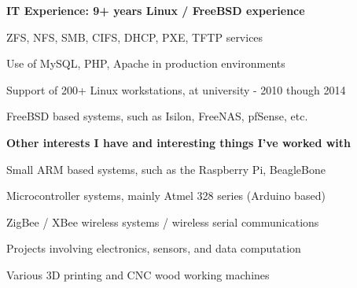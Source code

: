 \documentclass[10pt]{article}
\newcommand{\halfblankline}{\quad\vspace{-0.5\baselineskip}\pagebreak[3]}
\begin{document}
\begin{innerlist}
  \item[] \textbf{IT Experience: 9+ years Linux / FreeBSD experience}
  \begin{innerlist}
    \item ZFS, NFS, SMB, CIFS, DHCP, PXE, TFTP services
    \item Use of MySQL, PHP, Apache in production environments
    \item Support of 200+ Linux workstations, at university - 2010 though 2014
    \item FreeBSD based systems, such as Isilon, FreeNAS, pfSense, etc.
  \end{innerlist}

  \item[] \textbf{Other interests I have and interesting things I've worked with}
  \begin{innerlist}
    \item Small ARM based systems, such as the Raspberry Pi, BeagleBone
    \item Microcontroller systems, mainly Atmel 328 series (Arduino based)
    \item ZigBee / XBee wireless systems / wireless serial communications
    \item Projects involving electronics, sensors, and data computation
    \item Various 3D printing and CNC wood working machines
  \end{innerlist}

\end{innerlist}

\halfblankline
\end{document}
